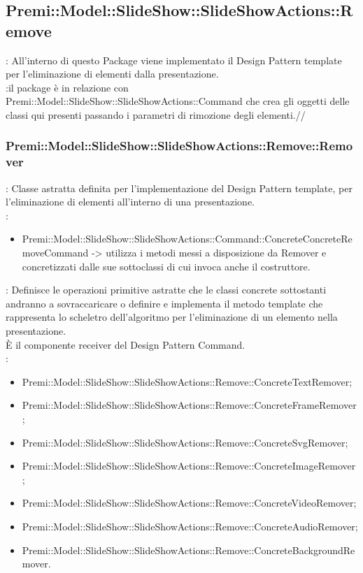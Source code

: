     	\subsection{Premi::Model::SlideShow::SlideShowActions::Remove}{
		\textbf{\tipo}: All’interno di questo Package viene implementato il Design Pattern template per l’eliminazione di elementi dalla presentazione.\\
		\textbf{\relaz}:il package è in relazione con Premi::Model::SlideShow::SlideShowActions::Command che crea gli oggetti delle classi qui presenti passando i parametri di rimozione degli elementi.//
	
	\subsubsection{Premi::Model::SlideShow::SlideShowActions::Remove::Remover}{
		\textbf{\tipo}: Classe astratta definita per l’implementazione del Design Pattern template, per l’eliminazione di elementi all’interno di una presentazione.\\	
		\textbf{\relaz}:
		\begin{itemize}
			\item Premi::Model::SlideShow::SlideShowActions::Command::ConcreteConcreteRemoveCommand -> utilizza i metodi messi a disposizione da Remover e concretizzati dalle sue sottoclassi di cui invoca anche il costruttore.
		\end{itemize} 
		\textbf{\interfacce}: Definisce le operazioni primitive astratte che le classi concrete sottostanti andranno a sovraccaricare o definire e implementa il metodo template che rappresenta lo scheletro dell'algoritmo per l’eliminazione di un elemento nella presentazione.\\
È il componente receiver del Design Pattern Command.\\
        \textbf{\figli}: 
        \begin{itemize}
            \item Premi::Model::SlideShow::SlideShowActions::Remove::ConcreteTextRemover;
            \item Premi::Model::SlideShow::SlideShowActions::Remove::ConcreteFrameRemover;
            \item Premi::Model::SlideShow::SlideShowActions::Remove::ConcreteSvgRemover;
            \item Premi::Model::SlideShow::SlideShowActions::Remove::ConcreteImageRemover;
            \item Premi::Model::SlideShow::SlideShowActions::Remove::ConcreteVideoRemover;
            \item Premi::Model::SlideShow::SlideShowActions::Remove::ConcreteAudioRemover;
            \item Premi::Model::SlideShow::SlideShowActions::Remove::ConcreteBackgroundRemover.
        \end{itemize}
	}
}
